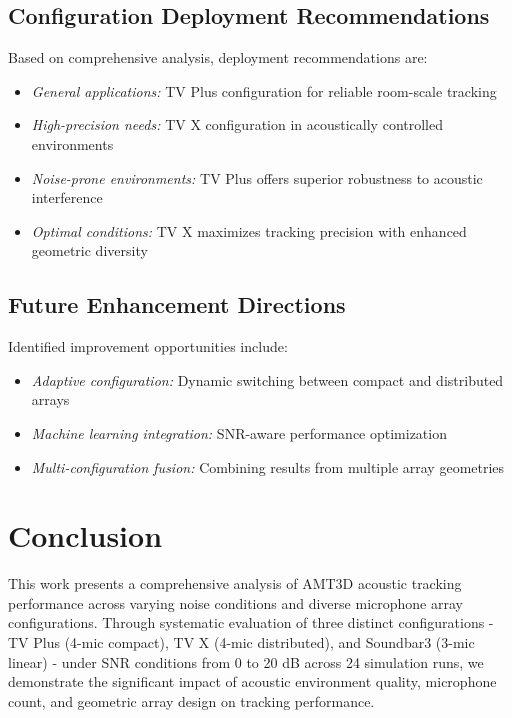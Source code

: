 \documentclass[a4paper]{article}
\begin{document}
\subsection{Configuration Deployment Recommendations}

Based on comprehensive analysis, deployment recommendations are:

\begin{itemize}
\item {\em General applications:} TV Plus configuration for reliable room-scale tracking
\item {\em High-precision needs:} TV X configuration in acoustically controlled environments
\item {\em Noise-prone environments:} TV Plus offers superior robustness to acoustic interference
\item {\em Optimal conditions:} TV X maximizes tracking precision with enhanced geometric diversity
\end{itemize}

\subsection{Future Enhancement Directions}

Identified improvement opportunities include:

\begin{itemize}
\item {\em Adaptive configuration:} Dynamic switching between compact and distributed arrays
\item {\em Machine learning integration:} SNR-aware performance optimization
\item {\em Multi-configuration fusion:} Combining results from multiple array geometries
\end{itemize}

\section{Conclusion}

This work presents a comprehensive analysis of AMT3D acoustic tracking performance across varying noise conditions and diverse microphone array configurations. Through systematic evaluation of three distinct configurations - TV Plus (4-mic compact), TV X (4-mic distributed), and Soundbar3 (3-mic linear) - under SNR conditions from 0 to 20 dB across 24 simulation runs, we demonstrate the significant impact of acoustic environment quality, microphone count, and geometric array design on tracking performance.
\end{document}
